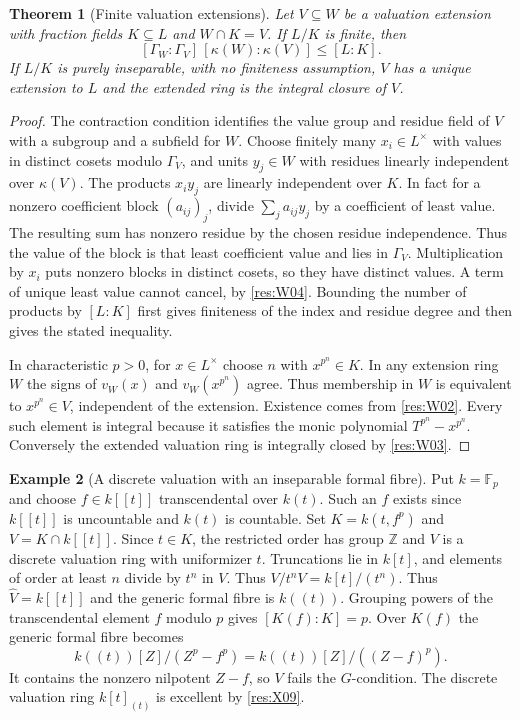 \documentclass[11pt,oneside,openany]{book}
\newtheorem{theorem}{Theorem}[chapter]
\theoremstyle{definition}
\newtheorem{example}[theorem]{Example}
\theoremstyle{remark}
\begin{document}
\begin{theorem}[Finite valuation extensions]\label{res:W08}
Let \(V\subseteq W\) be a valuation extension with fraction fields \(K\subseteq L\) and \(W\cap K=V\). If \(L/K\) is finite, then
\[
       [\Gamma_W:\Gamma_V]\,[\kappa(W):\kappa(V)]\le [L:K].
\]
If \(L/K\) is purely inseparable, with no finiteness assumption, \(V\) has a unique extension to \(L\) and the extended ring is the integral closure of \(V\).
\end{theorem}
\begin{proof}
The contraction condition identifies the value group and residue field of \(V\) with a subgroup and a subfield for \(W\). Choose finitely many \(x_i\in L^\times\) with values in distinct cosets modulo \(\Gamma_V\), and units \(y_j\in W\) with residues linearly independent over \(\kappa(V)\). The products \(x_i y_j\) are linearly independent over \(K\). In fact for a nonzero coefficient block \((a_{ij})_j\), divide \(\sum_j a_{ij}y_j\) by a coefficient of least value. The resulting sum has nonzero residue by the chosen residue independence. Thus the value of the block is that least coefficient value and lies in \(\Gamma_V\). Multiplication by \(x_i\) puts nonzero blocks in distinct cosets, so they have distinct values. A term of unique least value cannot cancel, by \ref{res:W04}. Bounding the number of products by \([L:K]\) first gives finiteness of the index and residue degree and then gives the stated inequality.

In characteristic \(p>0\), for \(x\in L^\times\) choose \(n\) with \(x^{p^n}\in K\). In any extension ring \(W\) the signs of \(v_W(x)\) and \(v_W(x^{p^n})\) agree. Thus membership in \(W\) is equivalent to \(x^{p^n}\in V\), independent of the extension. Existence comes from \ref{res:W02}. Every such element is integral because it satisfies the monic polynomial \(T^{p^n}-x^{p^n}\). Conversely the extended valuation ring is integrally closed by \ref{res:W03}.
\end{proof}

\begin{example}[A discrete valuation with an inseparable formal fibre]\label{res:W09}
Put \(k=\mathbb F_p\) and choose \(f\in k[[t]]\) transcendental over \(k(t)\).
Such an \(f\) exists since \(k[[t]]\) is uncountable and \(k(t)\) is countable.
Set \(K=k(t,f^p)\) and \(V=K\cap k[[t]]\). Since \(t\in K\), the restricted
order has group \(\mathbb Z\) and \(V\) is a discrete valuation ring with
uniformizer \(t\). Truncations lie in \(k[t]\), and elements of order
at least \(n\) divide by \(t^n\) in \(V\). Thus \(V/t^n V=k[t]/(t^n)\).
Thus \(\widehat V=k[[t]]\) and the generic formal fibre is \(k((t))\).
Grouping powers of the transcendental element \(f\) modulo \(p\) gives
\([K(f):K]=p\). Over \(K(f)\) the generic formal fibre becomes
\[
 k((t))[Z]/(Z^p-f^p)
        = k((t))[Z]/((Z-f)^p).
\]
It contains the nonzero nilpotent \(Z-f\), so \(V\) fails the \(G\)-condition.
The discrete valuation ring \(k[t]_{(t)}\) is excellent by \ref{res:X09}.
\end{example}
\end{document}
